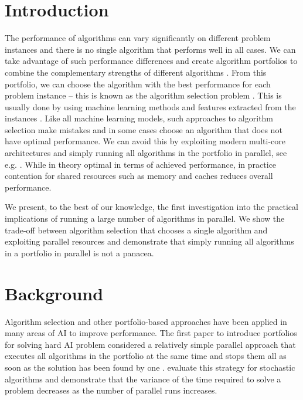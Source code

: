 \section{Introduction}

The performance of algorithms can vary significantly on different problem
instances and there is no single algorithm that performs well in all cases.
We can take advantage of such performance differences and create
algorithm portfolios to combine the complementary strengths of different
algorithms \cite{GOMES200143}. From this portfolio, we can choose the algorithm with the best performance for each problem instance -- this is known as the algorithm selection problem \cite{Rice1976}. This is usually done by using machine learning methods and features extracted from the instances \cite{Kotthoff2014}. Like all machine learning models, such approaches to algorithm selection make mistakes and in some cases choose an algorithm that does not have optimal performance. We can avoid this by exploiting modern multi-core architectures and simply running all algorithms in the portfolio in parallel, see e.g. \cite{sunnycp2}. While in theory optimal in terms of achieved performance, in practice contention for shared resources such as memory
and caches reduces overall performance.

We present, to the best of our knowledge, the first investigation into the
practical implications of running a large number of algorithms in parallel. We show the trade-off between algorithm selection that chooses a single algorithm and exploiting parallel resources and demonstrate that simply running all algorithms in a portfolio in parallel is not a panacea.

\section{Background}

Algorithm selection and other portfolio-based approaches have been applied in many areas of AI to improve performance. The first paper to introduce portfolios for solving hard AI problem considered a relatively simple parallel approach that executes all algorithms in the portfolio at the same time and stops them all as soon as the solution has been found by one \cite{Huberman1997}. \cite{GOMES200143,Hamadi2009} evaluate this strategy for stochastic algorithms and demonstrate that the variance of the time required to solve a problem decreases as the number of parallel runs increases.

